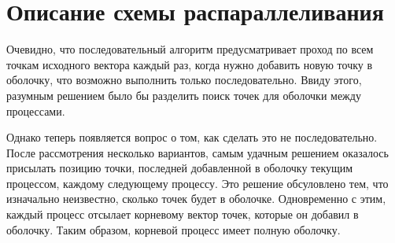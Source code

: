 \documentclass{report}
\begin{document}
\newpage

\section*{Описание схемы распараллеливания}
\par Очевидно, что последовательный алгоритм предусматривает проход по всем точкам исходного вектора каждый раз, когда нужно добавить новую точку в оболочку, что возможно выполнить только последовательно. Ввиду этого, разумным решением было бы разделить поиск точек для оболочки между процессами.
\par Однако теперь появляется вопрос о том, как сделать это не последовательно. После рассмотрения несколько вариантов, самым удачным решением оказалось присылать позицию точки, последней добавленной в оболочку текущим процессом, каждому следующему процессу. Это решение обсуловлено тем, что изначально неизвестно, сколько точек будет в оболочке. Одновременно с этим, каждый процесс отсылает корневому вектор точек, которые он добавил в оболочку. Таким образом, корневой процесс имеет полную оболочку.
\newpage

\end{document}
